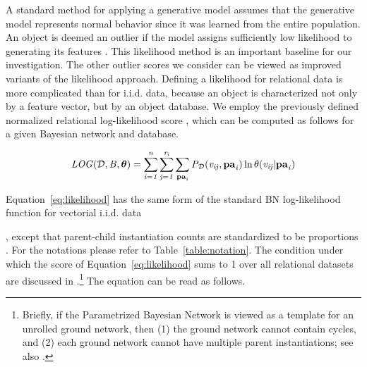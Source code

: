 {{	A standard method for applying a generative model assumes that the generative model represents normal behavior since it was learned from the entire population. An object is deemed an outlier if the model assigns sufficiently low likelihood to generating its features \citep{Cansado2008}. This likelihood method is an important baseline for our investigation.
The other outlier scores we consider can be viewed as improved variants of the likelihood approach. 
	Defining a likelihood for relational data is more complicated than for i.i.d. data, because an object is characterized not only by a feature vector, but by an object  database.
	We employ the previously defined normalized relational log-likelihood  score \citep{Schulte2011,Xiang2011}, which can be computed as follows for a given Bayesian network  and database.
	
	
	\begin{equation} \label{eq:likelihood}
		\it{LOG}(\mathcal{D},B,\boldsymbol{\theta}) =   \sum_{i=1}^{n}\sum_{j=1}^{r_{i}} \sum_{\mathbf{pa}_{i}}P_{\mathcal{D}}(v_{ij},\mathbf{pa}_{i})\ln \theta(v_{ij}|\mathbf{pa}_{i})  
	\end{equation}
	
	
	Equation~\eqref{eq:likelihood} has the same form of the standard BN log-likelihood function for vectorial i.i.d. data~\citep{Campos2006}}, except that parent-child instantiation counts are standardized to be proportions \citep{Schulte2011}. For the notations please refer to Table~\ref{table:notation}. The condition under which the score of Equation~\eqref{eq:likelihood} sums to 1 over all relational datasets are discussed in \citep{Schulte2011}.\footnote{Briefly, if the Parametrized Bayesian Network is viewed as a template for an unrolled ground network, then (1) the ground network cannot contain cycles, and (2) each ground network cannot have multiple parent instantiations; see also \citep{Heckerman+al:SRL07}.}  The equation can be read as follows.
	
}

